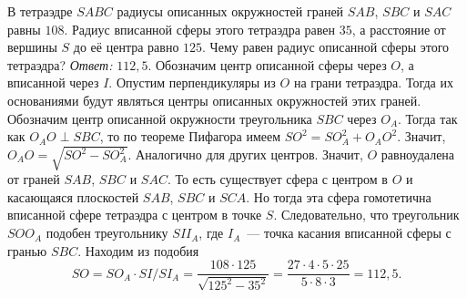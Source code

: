 \problem
В тетраэдре $SABC$ радиусы описанных окружностей граней $SAB$, $SBC$ и $SAC$
равны $108$.
Радиус вписанной сферы этого тетраэдра равен $35$, а расстояние от вершины $S$
до её центра равно $125$.
Чему равен радиус описанной сферы этого тетраэдра?
\solution
\emph{Ответ:} $112{,}5$.
Обозначим центр описанной сферы через $O$, а вписанной через $I$.
Опустим перпендикуляры из $O$ на грани тетраэдра.
Тогда их основаниями будут являться центры описанных окружностей этих граней.
Обозначим центр описанной окружности треугольника $SBC$ через $O_A$.
Тогда так как $O_AO \perp SBC$, то по теореме Пифагора имеем
$SO^2 = SO_A^2 + O_AO^2$.
Значит, $O_AO = \sqrt{SO^2 - SO_A^2}$.
Аналогично для других центров.
Значит, $O$ равноудалена от граней $SAB$, $SBC$ и $SAC$.
То есть существует сфера с центром в $O$ и касающаяся плоскостей
$SAB$, $SBC$ и $SCA$.
Но тогда эта сфера гомотетична вписанной сфере тетраэдра с центром в точке $S$.
Следовательно, что треугольник $SOO_A$ подобен треугольнику $SII_A$,
где $I_A$~--- точка касания вписанной сферы с гранью $SBC$.
Находим из подобия
\[
    SO
=
    SO_A \cdot SI / SI_A
=
    \dfrac{108 \cdot 125}{\sqrt{125^2 - 35^2}}
=
    \dfrac{27 \cdot 4 \cdot 5 \cdot 25}{5 \cdot 8 \cdot 3}
=
    112{,}5
.\]
\endproblem
